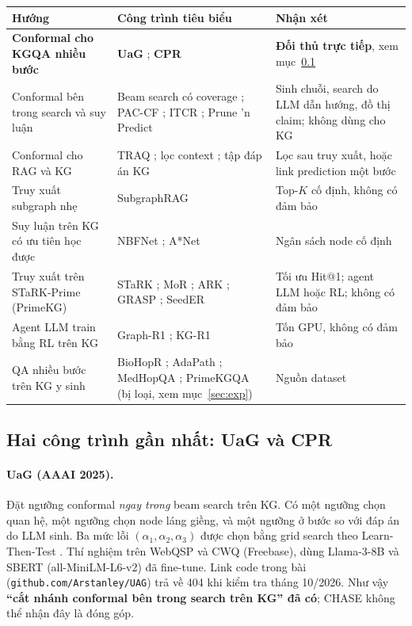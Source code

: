 \documentclass[11pt,a4paper]{article}
\theoremstyle{remark}
\newcommand{\method}{\textsc{CHASE}}
\begin{document}
\begin{center}
\small
\begin{tabularx}{\linewidth}{>{\raggedright\arraybackslash}p{3.6cm} >{\raggedright\arraybackslash}X >{\raggedright\arraybackslash}p{3.2cm}}
\toprule
Hướng & Công trình tiêu biểu & Nhận xét \\
\midrule
\textbf{Conformal cho KGQA nhiều bước} & \textbf{UaG} \cite{uag}; \textbf{CPR} \cite{cpr} & \textbf{Đối thủ trực tiếp}, xem mục~\ref{sec:closest} \\
Conformal bên trong search và suy luận & Beam search có coverage \cite{confbeam}; PAC-CF \cite{pacf}; ITCR \cite{itcr}; Prune 'n Predict \cite{prunenpredict} & Sinh chuỗi, search do LLM dẫn hướng, đồ thị claim; không dùng cho KG \\
Conformal cho RAG và KG & TRAQ \cite{traq}; lọc context \cite{confcontext}; tập đáp án KG \cite{confkg} & Lọc sau truy xuất, hoặc link prediction một bước \\
Truy xuất subgraph nhẹ & SubgraphRAG \cite{subgraphrag} & Top-$K$ cố định, không có đảm bảo \\
Suy luận trên KG có ưu tiên học được & NBFNet \cite{nbfnet}; A*Net \cite{astarnet} & Ngân sách node cố định \\
Truy xuất trên STaRK-Prime (PrimeKG) & STaRK \cite{stark}; MoR \cite{mor}; ARK \cite{ark}; GRASP \cite{grasp}; SeedER \cite{seeder} & Tối ưu Hit@1; agent LLM hoặc RL; không có đảm bảo \\
Agent LLM train bằng RL trên KG & Graph-R1 \cite{graphr1}; KG-R1 \cite{kgr1} & Tốn GPU, không có đảm bảo \\
QA nhiều bước trên KG y sinh & BioHopR \cite{biohopr}; AdaPath \cite{adapath}; MedHopQA \cite{medhopqa}; PrimeKGQA \cite{primekgqa} (bị loại, xem mục~\ref{sec:exp}) & Nguồn dataset \\
\bottomrule
\end{tabularx}
\end{center}

\subsection{Hai công trình gần nhất: UaG và CPR}\label{sec:closest}

\paragraph{UaG \cite{uag} (AAAI 2025).} Đặt ngưỡng conformal \emph{ngay trong} beam search trên KG. Có một ngưỡng chọn quan hệ, một ngưỡng chọn node láng giềng, và một ngưỡng ở bước so với đáp án do LLM sinh. Ba mức lỗi $(\alpha_1,\alpha_2,\alpha_3)$ được chọn bằng grid search theo Learn-Then-Test \cite{ltt}. Thí nghiệm trên WebQSP và CWQ (Freebase), dùng Llama-3-8B và SBERT (all-MiniLM-L6-v2) đã fine-tune. Link code trong bài (\texttt{github.com/Arstanley/UAG}) trả về 404 khi kiểm tra tháng 10/2026. Như vậy \textbf{``cắt nhánh conformal bên trong search trên KG'' đã có}; \method{} không thể nhận đây là đóng góp.
\end{document}
